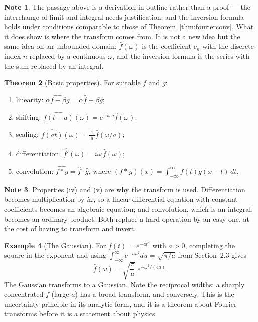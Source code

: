 \documentclass[12pt,a4paper]{report}
\theoremstyle{definition}
\newtheorem{thm}{Theorem}[section]
\newtheorem{exa}[thm]{Example}
\newtheorem{note}[thm]{Note}
\theoremstyle{plain}
\begin{document}
\begin{note}
The passage above is a derivation in outline rather than a proof --- the
interchange of limit and integral needs justification, and the inversion formula
holds under conditions comparable to those of Theorem~\ref{thm:fourierconv}.
What it does show is where the transform comes from. It is not a new idea but
the same idea on an unbounded domain: $\widehat{f}(\omega)$ is the coefficient
$c_n$ with the discrete index $n$ replaced by a continuous $\omega$, and the
inversion formula is the series with the sum replaced by an integral.
\end{note}

\begin{thm}[Basic properties]
For suitable $f$ and $g$:
\begin{enumerate}
\item[(i)] linearity: $\widehat{\alpha f+\beta g} = \alpha\widehat{f}+\beta\widehat{g}$;
\item[(ii)] shifting: $\widehat{f(t-a)}(\omega) = e^{-i\omega a}\widehat{f}(\omega)$;
\item[(iii)] scaling: $\widehat{f(at)}(\omega) = \frac{1}{|a|}\widehat{f}(\omega/a)$;
\item[(iv)] differentiation: $\widehat{f'}(\omega) = i\omega\,\widehat{f}(\omega)$;
\item[(v)] convolution: $\widehat{f*g} = \widehat{f}\cdot\widehat{g}$, where
$(f*g)(x)=\int^{\infty}_{-\infty}f(t)g(x-t)\,dt$.
\end{enumerate}
\end{thm}

\begin{note}
Properties (iv) and (v) are why the transform is used. Differentiation becomes
multiplication by $i\omega$, so a linear differential equation with constant
coefficients becomes an algebraic equation; and convolution, which is an
integral, becomes an ordinary product. Both replace a hard operation by an easy
one, at the cost of having to transform and invert.
\end{note}

\begin{exa}[The Gaussian]
For $f(t)=e^{-at^{2}}$ with $a>0$, completing the square in the exponent and
using $\int^{\infty}_{-\infty}e^{-au^{2}}du = \sqrt{\pi/a}$ from Section~2.3
gives
$$\widehat{f}(\omega) = \sqrt{\frac{\pi}{a}}\;e^{-\omega^{2}/(4a)} .$$
The Gaussian transforms to a Gaussian. Note the reciprocal widths: a sharply
concentrated $f$ (large $a$) has a broad transform, and conversely. This is the
uncertainty principle in its analytic form, and it is a theorem about Fourier
transforms before it is a statement about physics.
\end{exa}
\end{document}
